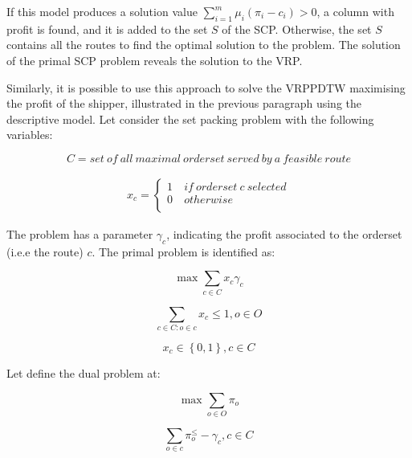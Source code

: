 If this model produces a solution value $\sum_{i=1}^{m}{\mu_i(\pi_i-c_i)}>0$, a column with profit is found, and it is added to the set $S$ of the SCP. Otherwise, the set $S$ contains all the routes to find the optimal solution to the problem. The solution of the primal SCP problem reveals the solution to the VRP. \par

Similarly, it is possible to use this approach to solve the VRPPDTW maximising the profit of the shipper, illustrated in the previous paragraph using the descriptive model. Let consider the set packing problem with the following variables:

\begin{equation}
    C=set\ of\ all\ maximal\ orderset\ served\ by\ a\ feasible\ route
\end{equation}

\begin{equation}
   \begin{split}
   x_c=\left\{
                \begin{array}{ll}
                  1\ & if\ orderset\ c\ selected\\
                  0 & otherwise\\
                \end{array}
              \right.
   \end{split}
\end{equation}

The problem has a parameter $\gamma_c$, indicating the profit associated to the orderset (i.e.e the route) $c$. The primal problem is identified as:

\begin{equation}
    \max{\sum_{c\in C}{x_c\gamma_c}}
\end{equation}

\begin{equation}
    \sum_{c\in C:o\in c}{x_c\le1} , o\in O
\end{equation}

\begin{equation}
    x_c\in\left\{0,1\right\} , c\in C
\end{equation}

Let define the dual problem at:

\begin{equation}
    \max{\sum_{o\in O}\pi_o}
\end{equation}

\begin{equation}
    \sum_{o\in c}{\pi_o^ \le-\gamma_c} , c\in C
\end{equation}

